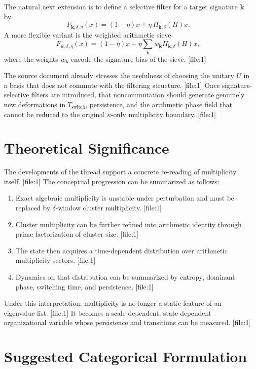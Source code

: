 \documentclass[11pt]{article}
\begin{document}
The natural next extension is to define a selective filter for a target signature $\mathbf{k}$ by
\[
F_{\mathbf{k},\delta,\eta}(x) = (1-\eta)x + \eta\,\Pi_{\mathbf{k},\delta}(H)x.
\]
A more flexible variant is the weighted arithmetic sieve
\[
F_{w,\delta,\eta}(x) = (1-\eta)x + \eta\sum_{\mathbf{k}} w_{\mathbf{k}}\Pi_{\mathbf{k},\delta}(H)x,
\]
where the weights $w_{\mathbf{k}}$ encode the signature bias of the sieve. [file:1]

The source document already stresses the usefulness of choosing the unitary $U$ in a basis that does not commute with the filtering structure. [file:1] Once signature-selective filters are introduced, that noncommutation should generate genuinely new deformations in $T_{\mathrm{switch}}$, persistence, and the arithmetic phase field that cannot be reduced to the original $\kappa$-only multiplicity boundary. [file:1]

\section{Theoretical Significance}

The developments of the thread support a concrete re-reading of multiplicity itself. [file:1] The conceptual progression can be summarized as follows:
\begin{enumerate}
    \item Exact algebraic multiplicity is unstable under perturbation and must be replaced by $\delta$-window cluster multiplicity. [file:1]
    \item Cluster multiplicity can be further refined into arithmetic identity through prime factorization of cluster size. [file:1]
    \item The state then acquires a time-dependent distribution over arithmetic multiplicity sectors. [file:1]
    \item Dynamics on that distribution can be summarized by entropy, dominant phase, switching time, and persistence. [file:1]
\end{enumerate}

Under this interpretation, multiplicity is no longer a static feature of an eigenvalue list. [file:1] It becomes a scale-dependent, state-dependent organizational variable whose persistence and transitions can be measured. [file:1]

\section{Suggested Categorical Formulation}
\end{document}
